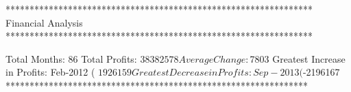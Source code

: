 **************************************************************** 
  Financial Analysis
****************************************************************

 Total Months: 86
 Total Profits: $38382578
 Average Change:  $7803
 Greatest Increase in Profits: Feb-2012 ( $1926159
 Greatest Decrease in Profits: Sep-2013 ( $-2196167
***************************************************************
